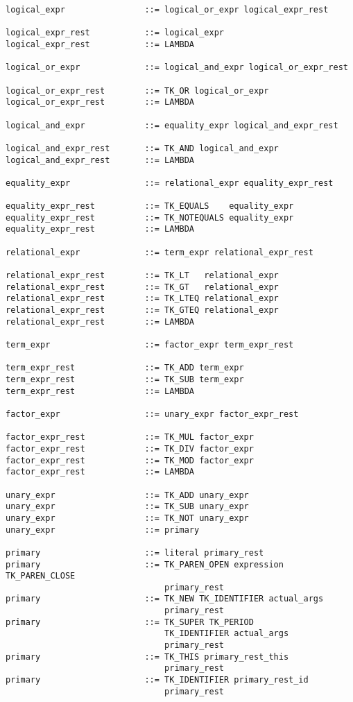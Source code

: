 \documentclass [a4paper,titlepage]{report}
\begin{document}
\begin{verbatim}
logical_expr                ::= logical_or_expr logical_expr_rest

logical_expr_rest           ::= logical_expr
logical_expr_rest           ::= LAMBDA

logical_or_expr             ::= logical_and_expr logical_or_expr_rest

logical_or_expr_rest        ::= TK_OR logical_or_expr
logical_or_expr_rest        ::= LAMBDA

logical_and_expr            ::= equality_expr logical_and_expr_rest

logical_and_expr_rest       ::= TK_AND logical_and_expr
logical_and_expr_rest       ::= LAMBDA

equality_expr               ::= relational_expr equality_expr_rest

equality_expr_rest          ::= TK_EQUALS    equality_expr
equality_expr_rest          ::= TK_NOTEQUALS equality_expr
equality_expr_rest          ::= LAMBDA

relational_expr             ::= term_expr relational_expr_rest

relational_expr_rest        ::= TK_LT   relational_expr
relational_expr_rest        ::= TK_GT   relational_expr
relational_expr_rest        ::= TK_LTEQ relational_expr
relational_expr_rest        ::= TK_GTEQ relational_expr
relational_expr_rest        ::= LAMBDA

term_expr                   ::= factor_expr term_expr_rest

term_expr_rest              ::= TK_ADD term_expr
term_expr_rest              ::= TK_SUB term_expr
term_expr_rest              ::= LAMBDA

factor_expr                 ::= unary_expr factor_expr_rest

factor_expr_rest            ::= TK_MUL factor_expr
factor_expr_rest            ::= TK_DIV factor_expr
factor_expr_rest            ::= TK_MOD factor_expr
factor_expr_rest            ::= LAMBDA

unary_expr                  ::= TK_ADD unary_expr
unary_expr                  ::= TK_SUB unary_expr
unary_expr                  ::= TK_NOT unary_expr
unary_expr                  ::= primary

primary                     ::= literal primary_rest
primary                     ::= TK_PAREN_OPEN expression TK_PAREN_CLOSE 
                                primary_rest
primary                     ::= TK_NEW TK_IDENTIFIER actual_args 
                                primary_rest
primary                     ::= TK_SUPER TK_PERIOD 
                                TK_IDENTIFIER actual_args 
                                primary_rest
primary                     ::= TK_THIS primary_rest_this 
                                primary_rest
primary                     ::= TK_IDENTIFIER primary_rest_id 
                                primary_rest


\end{verbatim}
\end{document}
